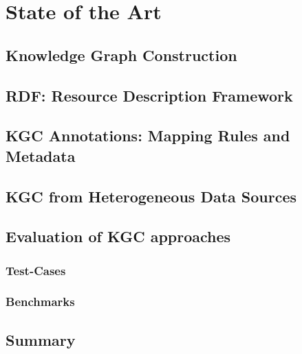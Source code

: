 \chapter{State of the Art}
\label{chap:soa}


\section{Knowledge Graph Construction}

\section{RDF: Resource Description Framework}

\section{KGC Annotations: Mapping Rules and Metadata}

\section{KGC from Heterogeneous Data Sources}

\section{Evaluation of KGC approaches}

\subsection{Test-Cases}
\subsection{Benchmarks}



\section{Summary}

